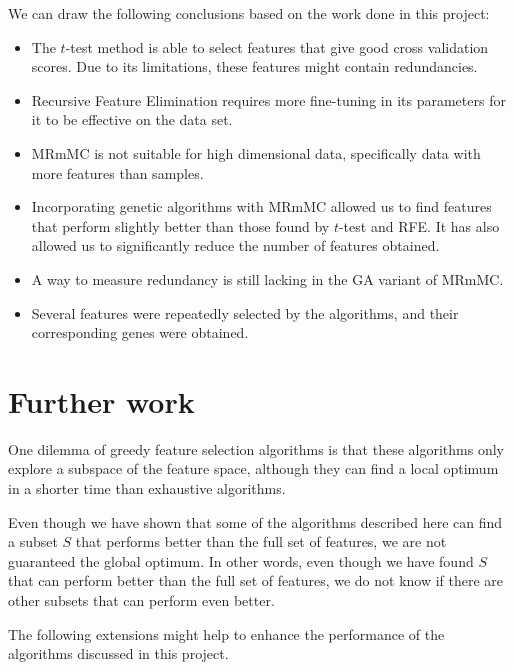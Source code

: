 \documentclass[12pt, twoside, a4paper]{report}
\begin{document}
We can draw the following conclusions based on the work done in this project:
\begin{itemize}
  \item The $t$-test method is able to select features that give good cross validation scores. Due to its limitations, these features might contain redundancies.
  \item Recursive Feature Elimination requires more fine-tuning in its parameters for it to be effective on the data set.
  \item MRmMC is not suitable for high dimensional data, specifically data with more features than samples.
  \item Incorporating genetic algorithms with MRmMC allowed us to find features that perform slightly better than those found by $t$-test and RFE. It has also allowed us to significantly reduce the number of features obtained.
  \item A way to measure redundancy is still lacking in the GA variant of MRmMC.
  \item Several features were repeatedly selected by the algorithms, and their corresponding genes were obtained.
\end{itemize}

\section{Further work} \label{further_work}


One dilemma of greedy feature selection algorithms is that these algorithms only explore a subspace of the feature space, although they can find a local optimum in a shorter time than exhaustive algorithms.


Even though we have shown that some of the algorithms described here can find a subset $S$ that performs better than the full set of features, we are not guaranteed the global optimum. In other words, even though we have found $S$ that can perform better than the full set of features, we do not know if there are other subsets that can perform even better.

The following extensions might help to enhance the performance of the algorithms discussed in this project.
\end{document}
